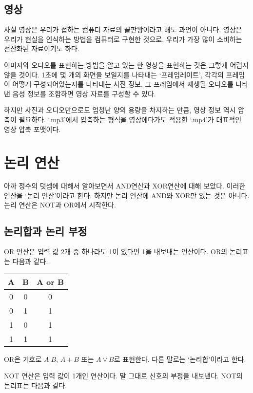 \documentclass{article}
\begin{document}
\subsection{영상}

사실 영상은 우리가 접하는 컴퓨터 자료의 끝판왕이라고 해도 과언이 아니다.
영상은 우리가 현실을 인식하는 방법을 컴퓨터로 구현한 것으로, 우리가 가장 많이 소비하는
전산화된 자료이기도 하다.

이미지와 오디오를 표현하는 방법을 알고 있는 한 영상을 표현하는 것은 그렇게 어렵지 않을 것이다.
1초에 몇 개의 화면을 보일지를 나타내는 `프레임레이트', 각각의 프레임이 어떻게 구성되어있는지를
나타내는 사진 정보, 그 프레임에서 재생될 오디오를 나타낸 음성 정보를 조합하면 영상 자료를
구성할 수 있다.

하지만 사진과 오디오만으로도 엄청난 양의 용량을 차지하는 만큼, 영상 정보 역시 압축이 필요하다.
`.mp3'에서 압축하는 형식을 영상에다가도 적용한 `.mp4'가 대표적인 영상 압축 포맷이다.


\section{논리 연산}

아까 정수의 덧셈에 대해서 알아보면서 AND연산과 XOR연산에 대해 보았다. 이러한 연산을 `논리
연산'이라고 한다. 하지만 논리 연산에 AND와 XOR만 있는 것은 아니다. 논리 연산은 NOT과 OR에서
시작한다.

\subsection{논리합과 논리 부정}

OR 연산은 입력 값 2개 중 하나라도 1이 있다면 1을 내보내는 연산이다. OR의 논리표는 다음과 같다.

\begin{center}
    \begin{tabular}{cc|c}
        A & B & A or B \\
        \hline
        0 & 0 & 0 \\
        0 & 1 & 1 \\
        1 & 0 & 1 \\
        1 & 1 & 1
    \end{tabular}
\end{center}

OR은 기호로 $A | B$, $A + B$ 또는 $A \vee B$로 표현한다. 다른 말로는 `논리합'이라고 한다.

NOT 연산은 입력 값이 1개인 연산이다. 말 그대로 신호의 부정을 내보낸다.
NOT의 논리표는 다음과 같다.
\end{document}
